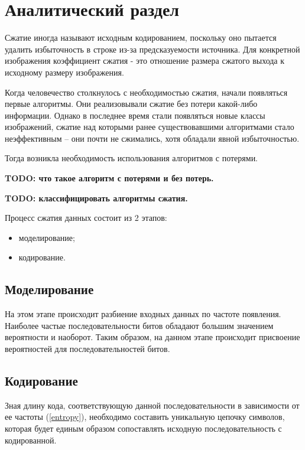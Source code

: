 \chapter{Аналитический раздел}

Сжатие иногда называют исходным кодированием, поскольку оно пытается удалить избыточность в строке из-за предсказуемости источника.
Для конкретной изображения коэффициент сжатия - это отношение размера сжатого выхода к исходному размеру изображения. \cite{text-compression}

Когда человечество столкнулось с необходимостью сжатия, начали появляться первые алгоритмы.
Они реализовывали сжатие без потери какой-либо информации.
Однако в последнее время стали появляться новые классы изображений, сжатие над которыми ранее существовавшими алгоритмами стало неэффективным -- они почти не сжимались, хотя обладали явной избыточностью. \cite{troubles-rating-while-compressing}

Тогда возникла необходимость использования алгоритмов с потерями.

\textbf{TODO: что такое алгоритм с потерями и без потерь.}

\textbf{TODO: классифицировать алгоритмы сжатия.}

Процесс сжатия данных состоит из 2 этапов:
\begin{itemize}
    \item моделирование;
    \item кодирование.
\end{itemize}

\section{Моделирование}

На этом этапе происходит разбиение входных данных по частоте появления. Наиболее частые последовательности битов обладают большим значением вероятности и наоборот.
Таким образом, на данном этапе происходит присвоение вероятностей для последовательностей битов. 

\section{Кодирование}

Зная длину кода, соответствующую данной последовательности в зависимости от ее частоты (\ref{entropy}), необходимо составить уникальную цепочку символов, которая будет единым образом сопоставлять исходную последовательность с кодированной.

